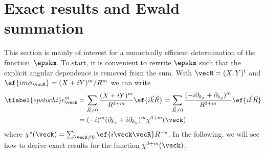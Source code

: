 %

\section{Exact results and Ewald summation}
\label{ewald}
This section is mainly of interest for a numerically efficient determination of the function~$\epskm$.
To start, it is convenient to rewrite $\epskm$ such that the explicit angular dependence is removed from the sum. With $\vecR = (X, Y)^t$ and $\ef{im\phi_\vecR} = (X+iY)^m/R^m$ we can write
\begin{align} \tlabel{epstochi}
    \epsilon^m_{\veck}
    &= \sum_{\vec{R}\ne 0} \frac{(X+i Y)^m}{R^{3+m}}\ef{i\vec{k}\vec{R}}
    = \sum_{\vec{R}\ne 0} \frac{(-i \partial_{k_x}+ \partial_{k_y})^m}{R^{3+m}} \ef{i\vec{k}\vec{R}} \\
    &= (-i)^m (\partial_{k_x}+ i \partial_{k_y})^m \chi^{3+m}(\veck)
\end{align}
where $\chi^s(\veck) = \sum_{\vecR\ne 0} \ef{i \veck \vecR} R^{-s}$.
In the following, we will see how to derive exact results for the function $\chi^{3+m}(\veck)$.

